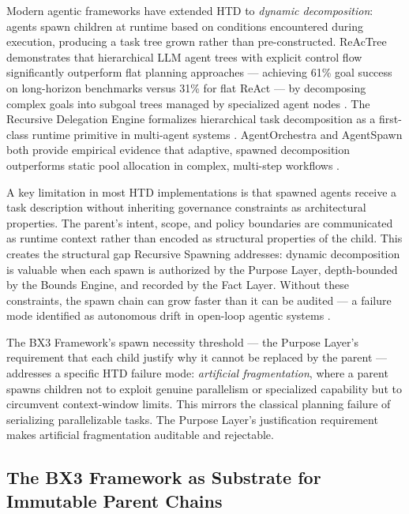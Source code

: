 Modern agentic frameworks have extended HTD to \emph{dynamic decomposition}: agents spawn children at runtime based on conditions encountered during execution, producing a task tree grown rather than pre-constructed. ReAcTree demonstrates that hierarchical LLM agent trees with explicit control flow significantly outperform flat planning approaches — achieving 61\% goal success on long-horizon benchmarks versus 31\% for flat ReAct — by decomposing complex goals into subgoal trees managed by specialized agent nodes \cite{reactree2025}. The Recursive Delegation Engine formalizes hierarchical task decomposition as a first-class runtime primitive in multi-agent systems \cite{rde2025}. AgentOrchestra and AgentSpawn both provide empirical evidence that adaptive, spawned decomposition outperforms static pool allocation in complex, multi-step workflows \cite{agentorchestra2025, agentspawn2025}.

A key limitation in most HTD implementations is that spawned agents receive a task description without inheriting governance constraints as architectural properties. The parent's intent, scope, and policy boundaries are communicated as runtime context rather than encoded as structural properties of the child. This creates the structural gap Recursive Spawning addresses: dynamic decomposition is valuable when each spawn is authorized by the Purpose Layer, depth-bounded by the Bounds Engine, and recorded by the Fact Layer. Without these constraints, the spawn chain can grow faster than it can be audited — a failure mode identified as autonomous drift in open-loop agentic systems \cite{autoGPT2023, xu2024}.

The BX3 Framework's spawn necessity threshold — the Purpose Layer's requirement that each child justify why it cannot be replaced by the parent — addresses a specific HTD failure mode: \emph{artificial fragmentation}, where a parent spawns children not to exploit genuine parallelism or specialized capability but to circumvent context-window limits. This mirrors the classical planning failure of serializing parallelizable tasks. The Purpose Layer's justification requirement makes artificial fragmentation auditable and rejectable.

\subsection{The BX3 Framework as Substrate for Immutable Parent Chains}
\label{sec:bx3-substrate}

